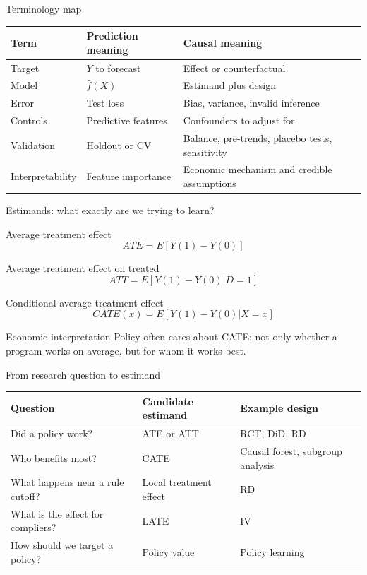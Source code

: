 \documentclass[aspectratio=169,11pt]{beamer}
\newcommand{\econ}[1]{\begin{exampleblock}{Economic interpretation}#1\end{exampleblock}}
\begin{document}
\begin{frame}{Terminology map}
\begin{center}
\begin{tabular}{p{}p{}p{}}
\toprule
Term & Prediction meaning & Causal meaning \\
\midrule
Target & $Y$ to forecast & Effect or counterfactual \\
Model & $\widehat f(X)$ & Estimand plus design \\
Error & Test loss & Bias, variance, invalid inference \\
Controls & Predictive features & Confounders to adjust for \\
Validation & Holdout or CV & Balance, pre-trends, placebo tests, sensitivity \\
Interpretability & Feature importance & Economic mechanism and credible assumptions \\
\bottomrule
\end{tabular}
\end{center}
\end{frame}

\begin{frame}{Estimands: what exactly are we trying to learn?}
\begin{block}{Average treatment effect}
\[
ATE = E[Y(1)-Y(0)]
\]
\end{block}
\begin{block}{Average treatment effect on treated}
\[
ATT = E[Y(1)-Y(0)|D=1]
\]
\end{block}
\begin{block}{Conditional average treatment effect}
\[
CATE(x)=E[Y(1)-Y(0)|X=x]
\]
\end{block}
\econ{
Policy often cares about CATE: not only whether a program works on average, but for whom it works best.
}
\end{frame}

\begin{frame}{From research question to estimand}
\begin{center}
\begin{tabular}{p{}p{}p{}}
\toprule
Question & Candidate estimand & Example design \\
\midrule
Did a policy work? & ATE or ATT & RCT, DiD, RD \\
Who benefits most? & CATE & Causal forest, subgroup analysis \\
What happens near a rule cutoff? & Local treatment effect & RD \\
What is the effect for compliers? & LATE & IV \\
How should we target a policy? & Policy value & Policy learning \\
\bottomrule
\end{tabular}
\end{center}
\end{frame}
\end{document}
